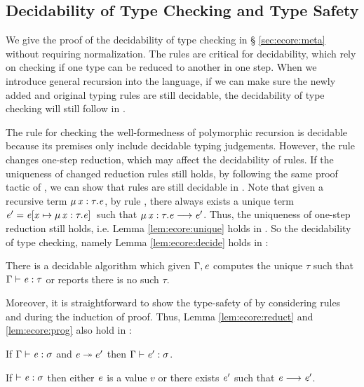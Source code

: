 \subsection{Decidability of Type Checking and Type Safety}
We give the proof of the decidability of type checking \ecore in \S
\ref{sec:ecore:meta} without requiring normalization. The \cast rules
are critical for decidability, which rely on checking if one type can
be reduced to another in one step. When we introduce general recursion
into the language, if we can make sure the newly added and original
typing rules are still decidable, the decidability of type checking
will still follow in \name.

The rule  for checking the well-formedness of
polymorphic recursion is decidable because its premises only include
decidable typing judgements. However, the rule  changes
one-step reduction, which may affect the decidability of \cast
rules. If the uniqueness of changed reduction rules still holds, by
following the same proof tactic of \ecore, we can show that \cast
rules are still decidable in \name. Note that given a recursive term
$\mu \, \mathit{x}  :  \tau  .  \mathit{e}$, by rule , there always exists a unique
term $\mathit{e'}=\mathit{e}  [  \mathit{x}  \mapsto  \mu \, \mathit{x}  :  \tau  .  \mathit{e}  ] \,$ such that $\mu \, \mathit{x}  :  \tau  .  \mathit{e}  \longrightarrow  \mathit{e'}$. Thus, the uniqueness of one-step reduction still holds,
i.e. Lemma \ref{lem:ecore:unique} holds in \name. So the decidability
of type checking, namely Lemma \ref{lem:ecore:decide} holds in \name:

\begin{lem}\label{lem:rec:decide}
	There is a decidable algorithm which given $\Gamma, \mathit{e}$ computes the unique
$\tau$ such that $\Gamma  \vdash  \mathit{e}  :  \tau$ or reports there is no such $\tau$.
\end{lem}

Moreover, it is straightforward to show the type-safety of \name by
considering rules  and  during the
induction of proof. Thus, Lemma \ref{lem:ecore:reduct} and \ref{lem:ecore:prog}
also hold in \name:

\begin{lem}\label{lem:rec:reduct}
If $\Gamma  \vdash  \mathit{e}  :  \sigma$ and $\mathit{e}  \twoheadrightarrow  e'$ then $\Gamma  \vdash  \mathit{e'}  :  \sigma$.
\end{lem}

\begin{lem}[Progress]\label{lem:rec:prog}
If $\vdash  \mathit{e}  :  \sigma$ then either $\mathit{e}$ is a value $v$ or there exists $\mathit{e}'$
such that $\mathit{e}  \longrightarrow  \mathit{e'}$.
\end{lem}
